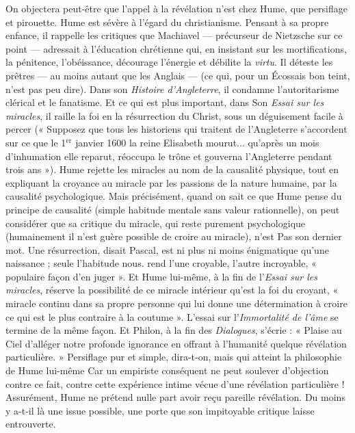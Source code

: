 On objectera peut-être que l’appel à la révélation n’est
chez Hume, que persiflage et pirouette. Hume est sévère
à l'égard du christianisme. Pensant à sa propre enfance,
il rappelle les critiques que Machiavel — précurseur de
Nietzsche sur ce point — adressait à l’éducation chrétienne qui,
en insistant sur les mortifications, la pénitence,
l’obéissance, décourage l’énergie et débilite la {\it virtu}. Il
déteste les prêtres — au moins autant que les Anglais —
(ce qui, pour un Écossais bon teint, n’est pas peu dire).
Dans son {\it Histoire d'Angleterre}, il condamne l’autoritarisme
clérical et le fanatisme. Et ce qui est plus important, dans
Son {\it Essai sur les miracles}, il raille la foi en la résurrection
du Christ, sous un déguisement facile à percer (« Supposez
que tous les historiens qui traitent de l’Angleterre s’accordent sur ce
que le 1$^\text{er}$ janvier 1600 la reine Elisabeth
mourut... qu'après un mois d’inhumation elle reparut,
réoccupa le trône et gouverna l’Angleterre pendant trois
ans »). Hume rejette les miracles au nom de la causalité
physique, tout en expliquant la croyance au miracle par
les passions de la nature humaine, par la causalité psychologique.
Mais précisément, quand on sait ce que Hume
pense du principe de causalité (simple habitude mentale
sans valeur rationnelle), on peut considérer que sa critique
du miracle, qui reste purement psychologique (humainement il n’est
guère possible de croire au miracle), n’est
Pas son dernier mot. Une résurrection, disait Pascal,
est ni plus ni moins énigmatique qu’une naissance ;
seule l’habitude nous. rend l’une croyable, l’autre incroyable,
« populaire façon d’en juger ». Et Hume lui-même, à la fin de
l’{\it Essai sur les miracles}, réserve la possibilité de ce miracle
intérieur qu’est la foi du croyant,
« miracle continu dans sa propre personne qui lui donne
une détermination à croire ce qui est le plus contraire
à la coutume ». L’essai sur l'{\it Immortalité de l’âme} se termine
de la même façon. Et Philon, à la fin des {\it Dialogues}, s’écrie :
« Plaise au Ciel d’alléger notre profonde ignorance en
offrant à l’humanité quelque révélation particulière. »
Persiflage pur et simple, dira-t-on, mais qui atteint la
philosophie de Hume lui-même Car un empiriste conséquent
ne peut soulever d’objection contre ce fait, contre cette
expérience intime vécue d’une révélation particulière !
Assurément, Hume ne prétend nulle part avoir reçu
pareille révélation. Du moins y a-t-il là une issue possible,
une porte que son impitoyable critique laisse entrouverte.
